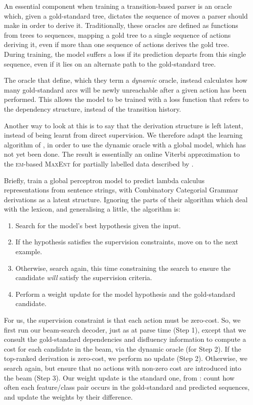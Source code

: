 \documentclass[11pt,letterpaper]{article}
\begin{document}
An essential component when training a transition-based parser is an oracle which,
given a gold-standard tree, dictates the sequence of moves a parser should make
in order to derive it. Traditionally, these oracles are defined as functions from
trees to sequences, mapping a gold tree to a single sequence of actions deriving it,
even if more than one sequence of actions derives the gold tree. During training,
the model suffers a loss if its prediction departs from this single 
sequence, even if it lies on an alternate path to the gold-standard tree.

The oracle that \citet{goldberg:12} define, which they term a \emph{dynamic} oracle,
instead calculates how many gold-standard arcs will be newly unreachable after a
given action has been performed. This allows the model to be trained with a
loss function that refers to the dependency structure, instead of the transition
history.  

Another way to look at this is to say that the derivation structure is left latent,
instead of being learnt from direct supervision.  
We therefore adapt the learning
algorithm of \citet{zettlemoyer:07}, in order to use the dynamic oracle with
a global model, which has not yet been done.  The result is essentially an
online Viterbi approximation to the \textsc{em}-based
\textsc{MaxEnt} for partially labelled data described by \citep{riezler:02}.

Briefly, \citeauthor{zettlemoyer:07} train a global perceptron model to predict
lambda calculus representations from sentence strings, with Combinatory
Categorial Grammar derivations as a latent structure.  Ignoring the parts of
their algorithm which deal with the lexicon, and generalising a little, the algorithm is:

\begin{enumerate}
\item Search for the model's best hypothesis given the input.
\item If the hypothesis satisfies the supervision constraints, move on to the
      next example.
\item Otherwise, search again, this time constraining the search to ensure the
    candidate \emph{will} satisfy the supervision criteria.
\item Perform a weight update for the model hypothesis and the gold-standard
      candidate.
\end{enumerate}

For us, the supervision constraint is that each action must be zero-cost.  So,
we first run our beam-search decoder, just as at parse time (Step 1),
except that we consult the gold-standard dependencies and disfluency information
to compute a cost for each candidate in the beam, via the dynamic oracle (for Step 2).
If the top-ranked derivation is zero-cost, we perform no update (Step 2).
Otherwise, we search again, but
ensure that no actions with non-zero cost are introduced into the beam (Step 3).
Our weight update is the standard one, from \citet{collins:02}: count how often
each feature/class pair occurs in the gold-standard and predicted sequences,
and update the weights by their difference.
\end{document}
